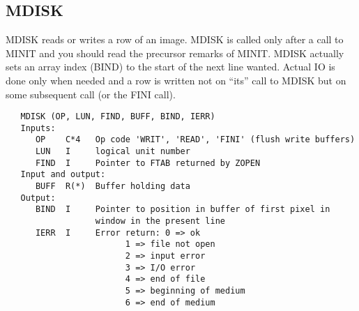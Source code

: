 \subsection{MDISK}
MDISK reads or writes a row of an image.  MDISK is called only after
a call to MINIT and you should read the precursor remarks of MINIT.
MDISK actually sets an array index (BIND) to the start of the next
line wanted.  Actual IO is done only when needed and a row is
written not on ``its'' call to MDISK but on some subsequent call (or
the FINI call).
\begin{verbatim}
   MDISK (OP, LUN, FIND, BUFF, BIND, IERR)
   Inputs:
      OP    C*4   Op code 'WRIT', 'READ', 'FINI' (flush write buffers)
      LUN   I     logical unit number
      FIND  I     Pointer to FTAB returned by ZOPEN
   Input and output:
      BUFF  R(*)  Buffer holding data
   Output:
      BIND  I     Pointer to position in buffer of first pixel in
                  window in the present line
      IERR  I     Error return: 0 => ok
                        1 => file not open
                        2 => input error
                        3 => I/O error
                        4 => end of file
                        5 => beginning of medium
                        6 => end of medium
\end{verbatim}

